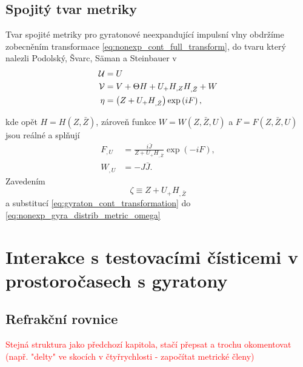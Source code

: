 \subsection{Spojitý tvar metriky}
Tvar spojité metriky pro gyratonové neexpandující impulsní vlny obdržíme zobecněním transformace \eqref{eq:nonexp_cont_full_transform},
do tvaru který nalezli Podolský, Švarc, Säman a Steinbauer v \cite{Podolsky_2017}
\begin{equation}
    \label{eq:gyraton_cont_transformation}
    \begin{split}
        \mathcal{U} &= U \\
        \mathcal{V} &= V + \Theta H + U_{+} H_{,Z} H_{,\bar{Z}} + W \\
        \eta &= \left(Z + U_{+} H_{,\bar{Z}}\right) \exp \left(i F \right),
    \end{split}
\end{equation}

kde opět $H = H(Z, \bar{Z})$, zároveň funkce $W = W(Z, \bar{Z}, U)$ a $F = F(Z, \bar{Z}, U)$ jsou reálné a splňují
\begin{equation}
    \begin{split}
        F_{,U} &= \frac{i\bar{J}}{Z + U_{+}H_{,\bar{Z}}} \exp{\left(-iF\right)}, \\
        W_{,U} &= -J \bar{J}.
    \end{split}
\end{equation}
Zavedením
\begin{equation}
    \zeta \equiv Z + U_{+} H_{,\bar{Z}}
\end{equation}
a substitucí \eqref{eq:gyraton_cont_transformation} do \eqref{eq:nonexp_gyra_distrib_metric_omega}


\section{Interakce s testovacími čísticemi v prostoročasech s gyratony}
\subsection{Refrakční rovnice}
\textcolor{red}{Stejná struktura jako předchozí kapitola, stačí přepsat a trochu okomentovat
(např. "delty" ve skocích v čtyřrychlosti - započítat metrické členy)}
